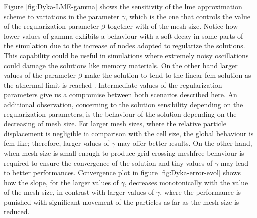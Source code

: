 \documentclass[preprint,12pt,a4paper]{elsarticle}
\begin{document}
Figure \eqref{fig:Dyka-LME-gamma} shows the sensitivity of the \acrshort{lme}
approximation scheme to variations in the parameter
$\gamma$, which is the one that controls the value of the regularization parameter
$\beta$ together with of the mesh size. Notice how lower values of
gamma exhibits a behaviour with a soft decay in some parts of the
simulation due to the increase of nodes adopted to regularize the
solutions. This capability could be useful in simulations where
extremely noisy oscillations could damage the solutions like memory
materials. On the other hand larger values of the parameter $\beta$
make the solution to tend to the linear \acrshort{fem} solution as the athermal limit is reached \cite{Arroyo2006}. Intermediate values of the
regularization parameters give us a compromise between both scenarios described here. An additional observation, concerning to the
solution sensibility depending on the regularization parameters, is the behaviour of the solution depending on the decreasing of mesh
size. For larger mesh sizes, where the relative particle displacement
is negligible in comparison with the cell size, the global behaviour
is \acrshort{fem}-like; therefore, larger values of $\gamma$ may offer better results. On the other hand, when mesh size is small enough to produce
grid-crossing meshfree behaviour is required to ensure the
convergence of the solution and tiny values of $\gamma$ may lead to better
performances. Convergence plot in figure \eqref{fig:Dyka-error-evol}
shows how the slope, for the larger values of $\gamma$, decreases
monotonically with the value of the mesh size, in contrast with larger
values of $\gamma$, where the performance is punished with significant
movement of the particles as far as the mesh size is reduced.
\end{document}
